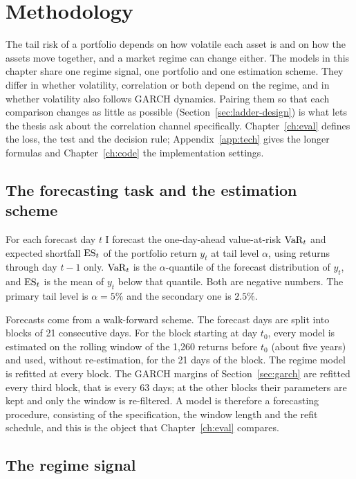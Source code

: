 \section{Methodology}\label{ch:method}

The tail risk of a portfolio depends on how volatile each asset is and on how the assets move together, and a market regime can change either. The models in this chapter share one regime signal, one portfolio and one estimation scheme. They differ in whether volatility, correlation or both depend on the regime, and in whether volatility also follows GARCH dynamics. Pairing them so that each comparison changes as little as possible (Section~\ref{sec:ladder-design}) is what lets the thesis ask about the correlation channel specifically. Chapter~\ref{ch:eval} defines the loss, the test and the decision rule; Appendix~\ref{app:tech} gives the longer formulas and Chapter~\ref{ch:code} the implementation settings.

\subsection{The forecasting task and the estimation scheme}\label{sec:walkforward}

For each forecast day $t$ I forecast the one-day-ahead value-at-risk $\mathrm{VaR}_t$ and expected shortfall $\mathrm{ES}_t$ of the portfolio return $y_t$ at tail level $\alpha$, using returns through day $t-1$ only. $\mathrm{VaR}_t$ is the $\alpha$-quantile of the forecast distribution of $y_t$, and $\mathrm{ES}_t$ is the mean of $y_t$ below that quantile. Both are negative numbers. The primary tail level is $\alpha=5\%$ and the secondary one is $2.5\%$.

Forecasts come from a walk-forward scheme. The forecast days are split into blocks of 21 consecutive days. For the block starting at day $t_0$, every model is estimated on the rolling window of the 1,260 returns before $t_0$ (about five years) and used, without re-estimation, for the 21 days of the block. The regime model is refitted at every block. The GARCH margins of Section~\ref{sec:garch} are refitted every third block, that is every 63 days; at the other blocks their parameters are kept and only the window is re-filtered. A model is therefore a forecasting procedure, consisting of the specification, the window length and the refit schedule, and this is the object that Chapter~\ref{ch:eval} compares.

\subsection{The regime signal}\label{sec:hmm}

